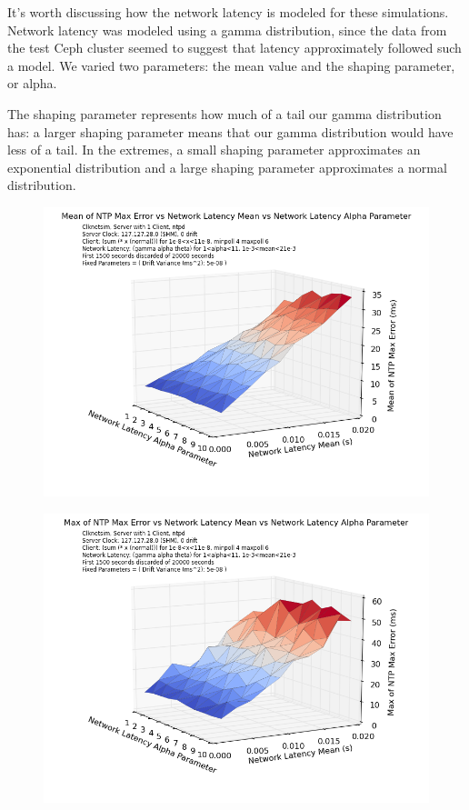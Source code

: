 It's worth discussing how the network latency is modeled for these
simulations. Network latency was modeled using a gamma distribution,
since the data from the test Ceph cluster seemed to suggest that
latency approximately followed such a model. We varied two parameters:
the mean value and the shaping parameter, or alpha.

The shaping parameter represents how much of a tail our gamma
distribution has: a larger shaping parameter means that our gamma
distribution would have less of a tail. In the extremes, a small
shaping parameter approximates an exponential distribution and a large
shaping parameter approximates a normal distribution.



\begin{figure}[h]
  \includegraphics[width=0.8\linewidth]{mean_max_error-mean_latency-latency_alpha.png}
\end{figure}


\begin{figure}[h]
  \includegraphics[width=0.8\linewidth]{max_error-latency_mean-latency_alpha.png}
\end{figure}

